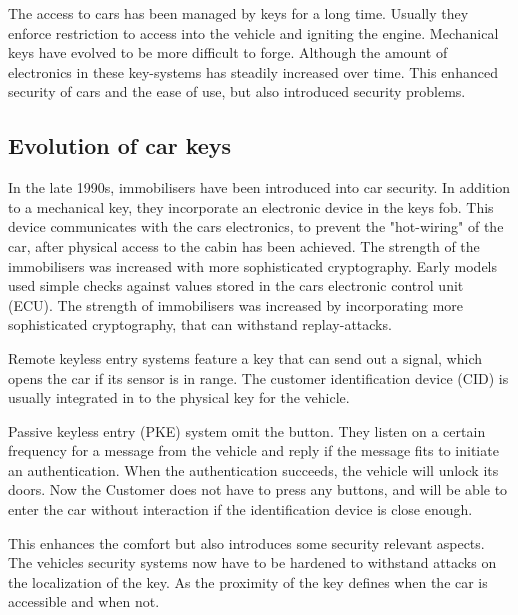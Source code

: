The access to cars has been managed by keys for a long time. %
Usually they enforce restriction to access into the vehicle
and igniting the engine.
Mechanical keys have evolved to be more difficult to forge.
Although the amount of electronics in these key-systems has steadily increased over time.
This enhanced security of cars and the ease of use,
but also introduced security problems.

\subsection*{Evolution of car keys}

In the late 1990s, immobilisers have been introduced into car security.
In addition to a mechanical key, 
they incorporate an electronic device in the keys fob.
This device communicates with the cars electronics,
to prevent the "hot-wiring" of the car,
after physical access to the cabin has been achieved.
The strength of the immobilisers was increased with more sophisticated cryptography.
Early models used simple checks against values stored in the cars electronic control unit (ECU).
The strength of immobilisers was increased by incorporating more
sophisticated cryptography,
that can withstand replay-attacks.	%

Remote keyless entry systems feature a key that can send out a signal,
which opens the car if its sensor is in range.
The customer identification device (CID) is usually integrated in to the physical key
for the vehicle.



Passive keyless entry (PKE) system omit the button.
They listen on a certain frequency for a message from the vehicle
and reply if the message fits to initiate an authentication.
When the authentication succeeds, the vehicle will unlock its doors.
Now the Customer does not have to press any buttons,
and will be able to enter the car without interaction 
if the identification device is close enough.

This enhances the comfort but also introduces some security relevant aspects.
The vehicles security systems now have to be hardened
to withstand attacks on the localization of the key.
As the proximity of the key defines when the car is accessible and when not. 

